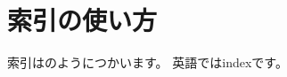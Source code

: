 \documentclass[./main]{subfiles}
\begin{document}
\chapter{索引の使い方}

索引はのようにつかいます。
英語ではindexです。
\end{document}
